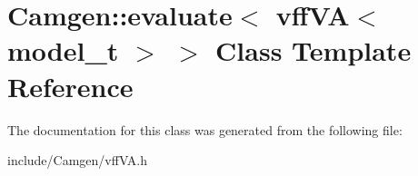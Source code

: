 \hypertarget{a00208}{}\section{Camgen\+:\+:evaluate$<$ vff\+V\+A$<$ model\+\_\+t $>$ $>$ Class Template Reference}
\label{a00208}


The documentation for this class was generated from the following file\+:\begin{DoxyCompactItemize}
\item 
include/\+Camgen/vff\+V\+A.\+h\end{DoxyCompactItemize}
